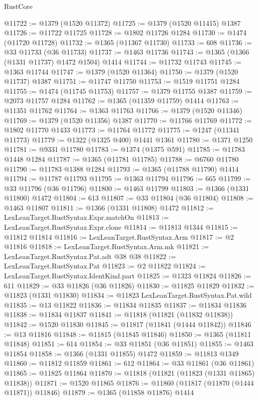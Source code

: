 \begin{lexlean}{RustCore}
\begin{coremodule}
@11722 := @1379 (@1520 @11372)
@11725 := @1379 (@1520 @11415) @1387
@11726 := @11722 @11725
@11728 := @1802 @11726 @1284
@11730 := @1474 (@11720 @11728)
@11732 := @1365 (@11367 @11730)
@11733 := 608
@11736 := @33 @11733 (@36 @11733)
@11737 := @1463 @11736
@11743 := @1365 (@1366 (@1331 @11737) @1472 @1504) @1414
@11744 := @11732 @11743
@11745 := @1363 @11744
@11747 := @1379 (@1520 @11364)
@11750 := @1379 (@1520 @11737) @1387
@11751 := @11747 @11750
@11753 := @1519 @11751 @1284
@11755 := @1474 (@11745 @11753)
@11757 := @1379 @11755 @1387
@11759 := @2073 @11757 @1284
@11762 := @1365 (@11359 @11759) @1414
@11763 := @11351 @11762
@11764 := @1363 @11763
@11766 := @1379 (@1520 @11346)
@11769 := @1379 (@1520 @11356) @1387
@11770 := @11766 @11769
@11772 := @1802 @11770 @1433
@11773 := @11764 @11772
@11775 := @1247 (@11341 @11773)
@11779 := @1322 (@1325 @400) @1441 @1361
@11780 := @1371 @1250
@11781 := @9331 @11780
@11783 := @1374 (@1375 @591)
@11785 := @11783 @1448 @1284
@11787 := @1365 (@11781 @11785)
@11788 := @6760 @11780
@11790 := @11783 @1388 @1284
@11793 := @1365 (@11788 @11790) @1414
@11794 := @11787 @11793
@11795 := @1363 @11794
@11796 := 665
@11799 := @33 @11796 (@36 @11796)
@11800 := @1463 @11799
@11803 := @1366 (@1331 @11800) @1472
@11804 := 613
@11807 := @33 @11804 (@36 @11804)
@11808 := @1463 @11807
@11811 := @1366 (@1331 @11808) @1472
@11812 := LexLeanTarget.RustSyntax.Expr.matchOn
@11813 := LexLeanTarget.RustSyntax.Expr.clone
@11814 := @11813 @1344
@11815 := @11812 @11814
@11816 := LexLeanTarget.RustSyntax.Arm
@11817 := @2 @11816
@11818 := LexLeanTarget.RustSyntax.Arm.mk
@11821 := LexLeanTarget.RustSyntax.Pat.adt @38 @38
@11822 := LexLeanTarget.RustSyntax.Pat
@11823 := @2 @11822
@11824 := LexLeanTarget.RustSyntax.IdentKind.part
@11825 := @1323 @11824
@11826 := 611
@11829 := @33 @11826 (@36 @11826)
@11830 := @11825 @11829
@11832 := @11823 (@1331 @11830)
@11834 := @11823 LexLeanTarget.RustSyntax.Pat.wild
@11835 := @13 @11822
@11836 := @11834 @11835
@11837 := @11834 @11836
@11838 := @11834 @11837
@11841 := @11818 (@11821 (@11832 @11838))
@11842 := @1520 @11830
@11845 := @11817 (@11841 (@1444 @11842))
@11846 := @13 @11816
@11848 := @11815 (@11845 @11846)
@11850 := @1365 (@11811 @11848)
@11851 := 614
@11854 := @33 @11851 (@36 @11851)
@11855 := @1463 @11854
@11858 := @1366 (@1331 @11855) @1472
@11859 := @11813 @1349
@11860 := @11812 @11859
@11861 := 612
@11864 := @33 @11861 (@36 @11861)
@11865 := @11825 @11864
@11870 := @11818 (@11821 (@11823 (@1331 @11865) @11838))
@11871 := @1520 @11865
@11876 := @11860 (@11817 (@11870 (@1444 @11871)) @11846)
@11879 := @1365 (@11858 @11876) @1414

\end{coremodule}
\end{lexlean}
